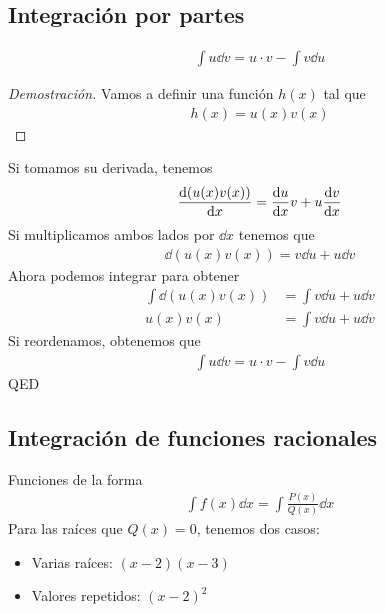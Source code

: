 \documentclass{article}
\begin{document}
\subsection{Integración por partes}
\begin{equation}
    \begin{split}
        \int u \dd{v} = u\cdot v - \int v \dd{u}
    \end{split}
\end{equation}
\begin{proof}[Demostración]
    Vamos a definir una función $h(x)$ tal que
    \begin{equation}
        \begin{split}
            h(x) = u(x)v(x)
        \end{split}
    \end{equation}
\end{proof}
Si tomamos su derivada, tenemos
\begin{equation}
    \begin{split}
        \dv{(u(x)v(x))}{x} = \dv{u}{x}v + u\dv{v}{x}
    \end{split}
\end{equation}
Si multiplicamos ambos lados por $\dd{x}$ tenemos que
\begin{equation}
    \begin{split}
        \dd{(u(x)v(x))} = v\dd{u} + u\dd{v}
    \end{split}
\end{equation}
Ahora podemos integrar para obtener
\begin{equation}
    \begin{split}
        \int \dd{(u(x)v(x))} &= \int v\dd{u} + u\dd{v}\\
        u(x)v(x) &= \int v\dd{u} + u\dd{v}
    \end{split}
\end{equation}
Si reordenamos, obtenemos que
\begin{equation}
    \begin{split}
        \int u \dd{v} = u\cdot v - \int v \dd{u}
    \end{split}
\end{equation}
QED
\subsection{Integración de funciones racionales}
Funciones de la forma
\begin{equation}
    \begin{split}
        \int f(x) \dd{x} = \int \frac{P(x)}{Q(x)} \dd{x}
    \end{split}
\end{equation}
Para las raíces que $Q(x) = 0$, tenemos dos casos:
\begin{itemize}
    \item Varias raíces: $(x-2)(x-3)$
    \item Valores repetidos: $(x-2)^{2}$
\end{itemize}
\end{document}
